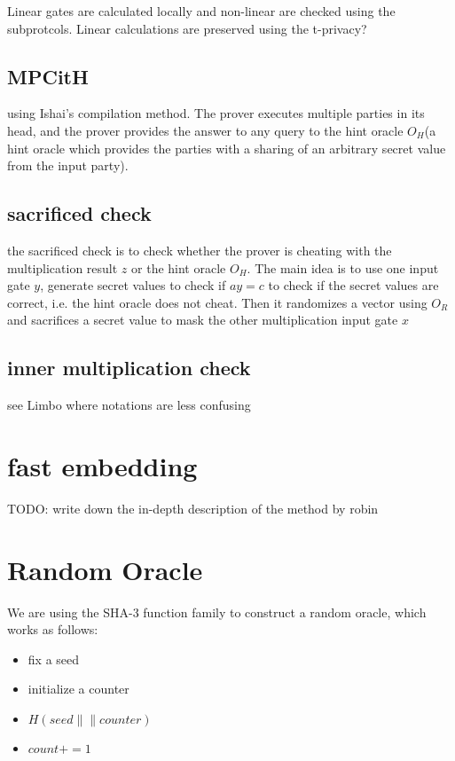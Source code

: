 \documentclass{article}
\begin{document}
Linear gates are calculated locally and non-linear are checked using the subprotcols. Linear calculations are preserved using the t-privacy?

\subsection{MPCitH}
using Ishai's compilation method. The prover executes multiple parties in its head, and the prover provides the answer to any query to the hint oracle $O_H$(a hint oracle which provides the parties with a sharing of an arbitrary secret value from the input party).

\subsection{sacrificed check}
the sacrificed check is to check whether the prover is cheating with the multiplication result $z$ or the hint oracle $O_H$. The main idea is to use one input gate $y$, generate secret values to check if $a y = c$ to check if the secret values are correct, i.e. the hint oracle does not cheat. Then it randomizes a vector using $O_R$ and sacrifices a secret value to mask the other multiplication input gate $x$

\subsection{inner multiplication check}

see Limbo where notations are less confusing

\section{fast embedding}

TODO: write down the in-depth description of the method by robin
\section{Random Oracle}
We are using the SHA-3 function family to construct a random oracle, which works as follows:

\begin{itemize}
\item fix a seed
\item initialize a counter
\item $H(seed \|\| counter)$
\item $count += 1$
\end{itemize}
\end{document}

